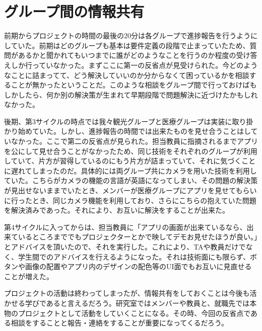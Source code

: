 \section{グループ間の情報共有}
前期からプロジェクトの時間の最後の20分は各グループで進捗報告を行うようにしていた。前期はどのグループも基本は要件定義の段階で止まっていたため、質問があるかと聞かれてもいつまでに誰がどのようなことを行うのか程度の受け答えしか行っていなかった。まずここに第一の反省点が見受けられた。今どのようなことに詰まってて、どう解決していいのか分からなくて困っているかを相談することが無かったということだ。このような相談をグループ間で行っておけばもしかしたら、何か別の解決策が生まれて早期段階で問題解決に近づけたかもしれなかった。
\par 後期、第3サイクルの時点では我々観光グループと医療グループは実装に取り掛かり始めていた。しかし、進捗報告の時間では出来たものを見せ合うことはしていなかった。ここで第二の反省点が見られた。担当教員に指摘されるまでアプリを公にして見せ合うことがなかったため、同じ技術をそれぞれのグループが利用していて、片方が習得しているのにもう片方が詰まっていて、それに気づくことに遅れてしまったのだ。具体的には両グループ共にカメラを用いた技術を利用していた。こちらがカメラの機能の言語が英語になってしまい、その問題の解決策が見出せないままでいたとき、メンバーが医療グループにアプリを見せてもらいに行ったとき、同じカメラ機能を利用しており、さらにこちらの抱えていた問題を解決済みであった。それにより、お互いに解決をすることが出来た。
\par 第4サイクルに入ってからは、担当教員に「アプリの画面が出来ているなら、出来ているところまででもプロジェクターとかで映してデモお見せたほうが良い。」とアドバイスを頂いたので、それを実行した。これにより、TAや教員だけでなく、学生間でのアドバイスを行えるようになった。それは技術面にも限らず、ボタンや画像の配置やアプリ内のデザインの配色等のUI面でもお互いに見直せることが増えた。
\par プロジェクトの活動は終わってしまったが、情報共有をしておくことは今後も活かせる学びであると言えるだろう。研究室ではメンバーや教員と、就職先では本物のプロジェクトとして活動をしていくことになる。その時、今回の反省点である相談をすることと報告・連絡をすることが重要になってくるだろう。
